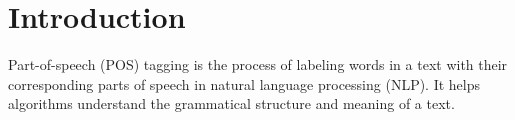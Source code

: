 \section{Introduction}
\label{sec:nlp_pos_intro}

Part-of-speech (POS) tagging is the process of labeling words in a text with their corresponding parts of speech in natural language processing (NLP). It helps algorithms understand the grammatical structure and meaning of a text.
